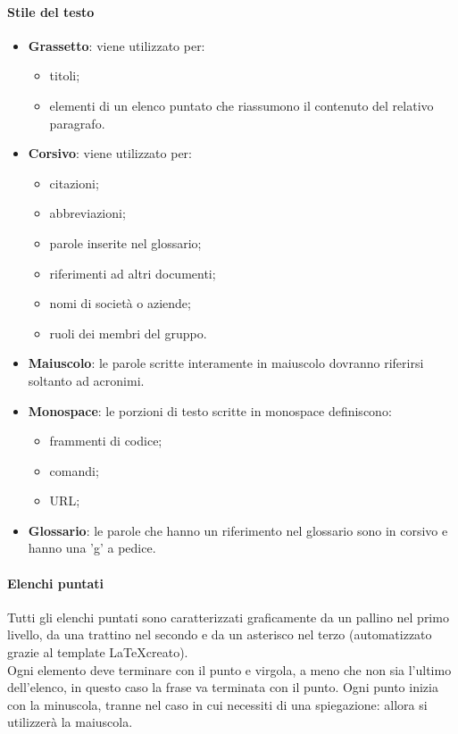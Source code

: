  \paragraph{Stile del testo} 
\begin{itemize}
	\item \textbf{Grassetto}: viene utilizzato per:
	\begin{itemize}
		\item titoli;
		\item elementi di un elenco puntato che riassumono il contenuto del relativo paragrafo.
	\end{itemize}
	\item \textbf{Corsivo}: viene utilizzato per:
	\begin{itemize}
		\item citazioni;
		\item abbreviazioni;
		\item parole inserite nel glossario;
		\item riferimenti ad altri documenti;
		\item nomi di società o aziende;
		\item ruoli dei membri del gruppo.
	\end{itemize}
	\item \textbf{Maiuscolo}: le parole scritte interamente in maiuscolo dovranno riferirsi soltanto ad acronimi.
	\item \textbf{Monospace}: le porzioni di testo scritte in monospace definiscono:
	\begin{itemize}
		\item frammenti di codice;
		\item comandi;
		\item URL;
	\end{itemize}
	\item \textbf{Glossario}: le parole che hanno un riferimento nel glossario sono in corsivo e hanno una 'g' a pedice.
\end{itemize}
 \paragraph{Elenchi puntati}
Tutti gli elenchi puntati sono caratterizzati graficamente da un pallino nel primo livello, da una trattino nel secondo e da un asterisco nel terzo (automatizzato grazie al template \LaTeX creato). \\
Ogni elemento deve terminare con il punto e virgola, a meno che non sia l'ultimo dell'elenco, in questo caso la frase va terminata con il punto. Ogni punto inizia con la minuscola, tranne nel caso in cui necessiti di una spiegazione: allora
si utilizzerà la maiuscola.
